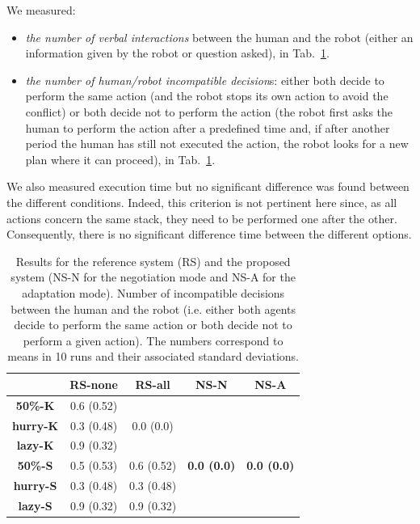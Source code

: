 \documentclass[english,a4paper,11pt,twoside]{StyleThese}
\begin{document}
We measured:
\begin{itemize}
\item \textit{the number of verbal interactions} between the human and the robot (either an information given by the robot or question asked), in Tab.~\ref{tab:incompatible}.
\item \textit{the number of human/robot incompatible decision}s: either both decide to perform the same action (and the robot stops its own action to avoid the conflict) or both decide not to perform the action (the robot first asks the human to perform the action after a predefined time and, if after another period the human has still not executed the action, the robot looks for a new plan where it can proceed), in Tab.~\ref{tab:incompatible}.
\end{itemize}
We also measured execution time but no significant difference was found between the different conditions. Indeed, this criterion is not pertinent here since, as all actions concern the same stack, they need to be performed one after the other. Consequently, there is no significant difference time between the different options.

\begin{table}[!h]
\centering
  \begin{tabular}{|c||c|c|c|c|}
  \hline
     & \textbf{RS-none} & \textbf{RS-all} & \textbf{NS-N} & \textbf{NS-A} \\
  \hline
  \hline
     \textbf{50\%-K} & 0.6 (0.52) & & &  \\
  \cline{1-2}
     \textbf{hurry-K} & 0.3 (0.48) & 0.0 (0.0) & & \\
  \cline{1-2}
     \textbf{lazy-K} & 0.9 (0.32) &  &  &  \\
  \cline{1-3}
     \textbf{50\%-S} & 0.5 (0.53) & 0.6 (0.52) & \textbf{0.0 (0.0)} & \textbf{0.0 (0.0)} \\
  \cline{1-3}
     \textbf{hurry-S} & 0.3 (0.48) & 0.3 (0.48) &  &  \\
  \cline{1-3}
     \textbf{lazy-S} & 0.9 (0.32) & 0.9 (0.32) &  &  \\
  \hline
  \end{tabular}
   \caption{Results for the reference system (RS) and the proposed system (NS-N for the negotiation mode and NS-A for the adaptation mode). Number of incompatible decisions between the human and the robot (i.e. either both agents decide to perform the same action or both decide not to perform a given action). The numbers correspond to means in 10 runs and their associated standard deviations.}
   \label{tab:incompatible} 
\end{table}
\end{document}
